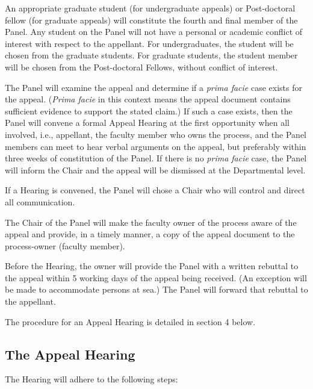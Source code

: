  An appropriate graduate student (for undergraduate appeals) or
Post-doctoral fellow (for graduate appeals) will constitute the fourth and
final member of the Panel.  Any student on the Panel will not have a personal
or academic conflict of interest with respect to the appellant.  For
undergraduates, the student will be chosen from the graduate students.  For
graduate students, the student member will be chosen from the Post-doctoral
Fellows, without conflict of interest.  

 The Panel will examine the appeal and determine if a \emph{prima
facie} case exists for the appeal.  (\emph{Prima facie} in this context means
the appeal document contains sufficient evidence to support the stated claim.)
If such a case exists, then the Panel will convene a formal Appeal Hearing at
the first opportunity when all involved, i.e., appellant, the faculty member
who owns the process, and the Panel members can meet to hear verbal arguments
on the appeal, but preferably within three weeks of constitution of the Panel.
If there is no \emph{prima facie} case, the Panel will inform the Chair and the
appeal will be dismissed at the Departmental level. 

 If a Hearing is convened, the Panel will chose a Chair who will
control and direct all communication.  

 The Chair of the Panel will make the faculty owner of the process
aware of the appeal and provide, in a timely manner, a copy of the appeal
document to the process-owner (faculty member).  

 Before the Hearing, the  owner will provide 
the Panel with a written rebuttal to the appeal within 5 working days of the
appeal being received.  (An exception will be made to accommodate persons at
sea.)  The Panel will forward that rebuttal to the appellant. 

 The procedure for an Appeal Hearing is detailed in section 4 below.


\subsection{The Appeal Hearing}

 The Hearing will adhere to the following steps:

